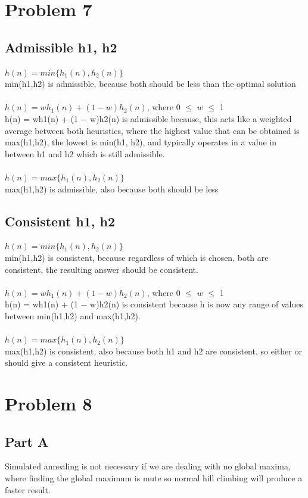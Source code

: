 \documentclass[12pt]{article}
\begin{document}
	\section*{Problem 7}
		\subsection*{Admissible h1, h2}
			$h(n) = min\{h_1(n), h_2(n)\}$ \\
			min(h1,h2) is admissible, because both should be less than the optimal solution\\ \\
			$h(n) = wh_1(n) + (1-w)h_2(n)$, where 0 $\leq$ $w$ $\leq$ 1 \\  
			h(n) = wh1(n) + (1 − w)h2(n) is admissible because, this acts like a weighted average between both heuristics, where the highest value that can be obtained is max(h1,h2),  the lowest is min(h1, h2), and typically operates in a value in between h1 and h2 which is still admissible. \\ \\
			$h(n) = max\{h_1(n), h_2(n)\}$ \\
			max(h1,h2) is admissible, also because both should be less
			
		\subsection*{Consistent h1, h2}			
		$h(n) = min\{h_1(n), h_2(n)\}$ \\
		min(h1,h2) is consistent, because regardless of which is chosen, both are consistent, the resulting answer should be consistent.\\ \\
		$h(n) = wh_1(n) + (1-w)h_2(n)$, where 0 $\leq$ $w$ $\leq$ 1 \\  
		 h(n) = wh1(n) + (1 − w)h2(n) is consistent because h is now any range of values between min(h1,h2) and max(h1,h2). \\ \\
		$h(n) = max\{h_1(n), h_2(n)\}$ \\
		max(h1,h2) is consistent, also because both h1 and h2 are consistent, so either or should give a consistent heuristic.
	
	\section*{Problem 8}
		\subsection*{Part A}
		Simulated annealing is not necessary if we are dealing with no global maxima, where finding the global maximum is mute so normal hill climbing will produce a faster result.
\end{document}
